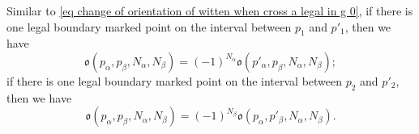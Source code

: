 \documentclass[11pt,a4paper]{article}
\theoremstyle{definition}
\theoremstyle{remark}
\numberwithin{equation}{section}
\begin{document}
Similar to \eqref{eq change of orientation of witten when cross a legal in g 0}, if there is one legal boundary marked point on the interval between $p_1$ and $p'_1$, then we have 
\begin{equation}\label{eq change of orientation of witten when cross a legal in g 1 1st bdry}
\mathfrak o(p_\alpha,p_\beta,N_\alpha,N_\beta)=(-1)^{N_\alpha}\mathfrak o(p'_\alpha,p_\beta,N_\alpha,N_\beta);
\end{equation} 
if there is one legal boundary marked point on the interval between $p_2$ and $p'_2$, then we have 
\begin{equation}\label{eq change of orientation of witten when cross a legal in g 1 2nd bdry}
\mathfrak o(p_\alpha,p_\beta,N_\alpha,N_\beta)=(-1)^{N_\beta}\mathfrak o(p_\alpha,p'_\beta,N_\alpha,N_\beta).
\end{equation}
\end{document}
